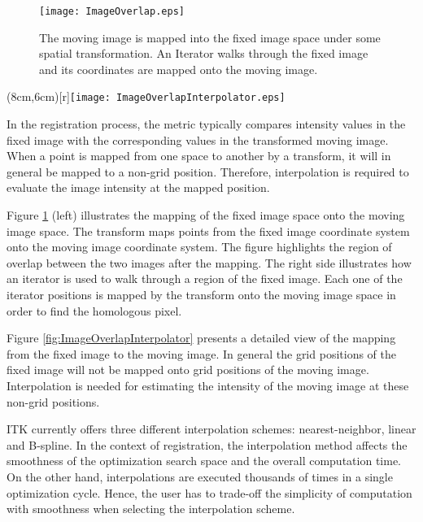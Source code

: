 % 
%

\begin{figure}
\center
\texttt{[image: ImageOverlap.eps]}
\caption{ The moving image is mapped into the fixed image space under some
spatial transformation. An Iterator walks through the fixed image and its
coordinates are mapped onto the moving image.}
\label{fig:ImageOverlapIterator}
\end{figure}


\parpic(8cm,6cm)[r]{\texttt{[image: ImageOverlapInterpolator.eps]}}

In the registration process, the metric typically compares intensity values 
in the fixed image with the corresponding values in the transformed moving
image. When a point is mapped from one space to another by a transform,
it will in general be mapped to a non-grid position. Therefore, interpolation
is required to evaluate the image intensity at the mapped position.

Figure \ref{fig:ImageOverlapIterator} (left) illustrates the mapping of the
fixed image space onto the moving image space. The transform maps points from
the fixed image coordinate system onto the moving image coordinate system. The
figure highlights the region of overlap between the two images after the
mapping. The right side illustrates how an iterator is used to walk through a
region of the fixed image. Each one of the iterator positions is mapped by the
transform onto the moving image space in order to find the homologous pixel.

Figure \ref{fig:ImageOverlapInterpolator} presents a detailed view of the
mapping from the fixed image to the moving image. In general the grid positions
of the fixed image will not be mapped onto grid positions of the moving image.
Interpolation is needed for estimating the intensity of the moving image at
these non-grid positions.


ITK currently offers three different interpolation schemes: nearest-neighbor,
linear and B-spline. In the context of registration, the interpolation method
affects the smoothness of the optimization search space and the overall
computation time. On the other hand, interpolations are executed thousands of
times in a single optimization cycle. Hence, the user has to trade-off the
simplicity of computation with smoothness when selecting the interpolation 
scheme.

